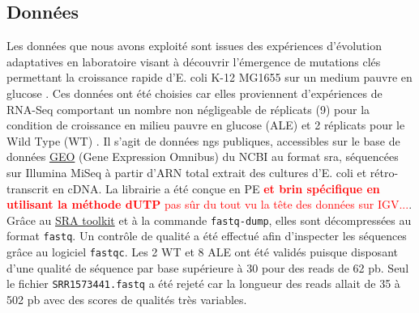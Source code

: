 \documentclass[12pt,a4paper]{report}
\begin{document}
\begin{onehalfspace}
\section*{Données}
Les données que nous avons exploité sont issues des expériences d'évolution adaptatives en laboratoire visant à découvrir l'émergence de mutations clés permettant la croissance rapide d'E. coli K-12 MG1655 sur un medium pauvre en glucose \citep{Lacroix2014}. Ces données ont été choisies car elles proviennent d'expériences de RNA-Seq comportant un nombre non négligeable de réplicats (9) pour la condition de croissance en milieu pauvre en glucose (ALE) et 2 réplicats pour le Wild Type (WT) . Il s'agit de données \gls{ngs} publiques, accessibles sur le base de données \href{http://www.ncbi.nlm.nih.gov/geo/query/acc.cgi?acc=GSE61327}{GEO} (Gene Expression Omnibus) du NCBI au format \gls{sra}, séquencées sur Illumina MiSeq à partir d'ARN total extrait des cultures d'E. coli et rétro-transcrit en cDNA. La librairie a été conçue en \gls{PE} \textcolor{red}{\textbf{et brin spécifique en utilisant la méthode dUTP} \citep{Levin2010} pas sûr du tout vu la tête des données sur IGV...}. Grâce au \href{http://www.ncbi.nlm.nih.gov/books/NBK158900/#SRA_download.how_do_i_use_the_sra_toolki}{SRA toolkit} et à la commande \texttt{fastq-dump}, elles sont décompressées au format \texttt{fastq}. Un contrôle de qualité a été effectué afin d'inspecter les séquences grâce au logiciel \texttt{fastqc}. Les 2 WT et 8 ALE ont été validés puisque disposant d'une qualité de séquence par base supérieure à 30 pour des \gls{reads} de 62 pb. Seul le fichier \texttt{SRR1573441.fastq} a été rejeté car la longueur des reads allait de 35 à 502 pb avec des scores de qualités très variables.


\end{onehalfspace}
\end{document}
